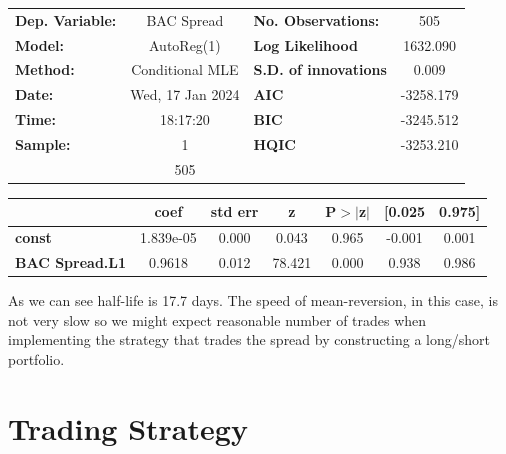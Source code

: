 \documentclass[a4paper, 11pt]{article}
\begin{document}
\begin{center}
\begin{tabular}{lclc}
\toprule
\textbf{Dep. Variable:} &         BAC Spread        & \textbf{  No. Observations:  } &            505             \\
\textbf{Model:}         &         AutoReg(1)        & \textbf{  Log Likelihood     } &          1632.090          \\
\textbf{Method:}        &      Conditional MLE      & \textbf{  S.D. of innovations} &           0.009            \\
\textbf{Date:}          &      Wed, 17 Jan 2024     & \textbf{  AIC                } &         -3258.179          \\
\textbf{Time:}          &          18:17:20         & \textbf{  BIC                } &         -3245.512          \\
\textbf{Sample:}        &             1             & \textbf{  HQIC               } &         -3253.210          \\
\textbf{}               &            505            & \textbf{                     } &                            \\
\bottomrule
\end{tabular}
\begin{tabular}{lcccccc}
                       & \textbf{coef} & \textbf{std err} & \textbf{z} & \textbf{P$> |$z$|$} & \textbf{[0.025} & \textbf{0.975]}  \\
\midrule
\textbf{const}         &    1.839e-05  &        0.000     &     0.043  &         0.965        &       -0.001    &        0.001     \\
\textbf{BAC Spread.L1} &       0.9618  &        0.012     &    78.421  &         0.000        &        0.938    &        0.986     \\
\bottomrule
\end{tabular}
\end{center}

As we can see half-life is 17.7 days.
The speed of mean-reversion, in this case, is not very slow so we might expect reasonable number of trades when implementing the strategy that trades the spread by constructing a long/short portfolio.



\pagebreak
\section{Trading Strategy}
\end{document}
